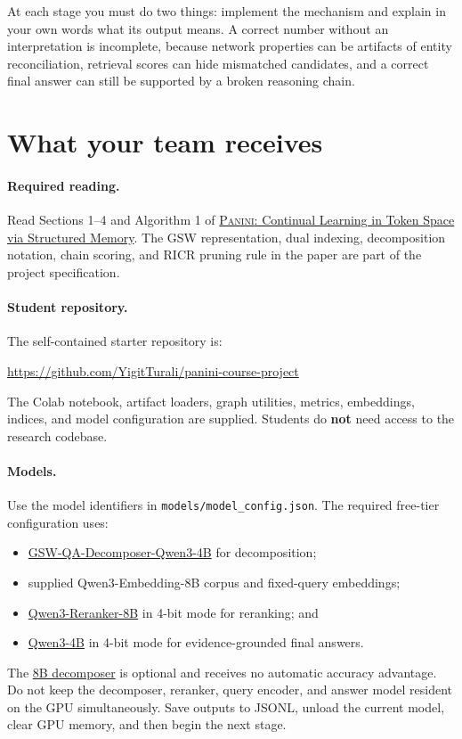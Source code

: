 \documentclass[11pt]{article}
\newcommand{\code}[1]{\texttt{#1}}
\newcommand{\RICR}{{\mdseries\textsc{RICR}}\xspace}
\newcommand{\PANINI}{{\mdseries\textsc{Panini}}\xspace}
\begin{document}
At each stage you must do two things: implement the mechanism and explain in
your own words what its output means. A correct number without an
interpretation is incomplete, because network properties can be artifacts of
entity reconciliation, retrieval scores can hide mismatched candidates, and a
correct final answer can still be supported by a broken reasoning chain.

\section{What your team receives}

\paragraph{Required reading.}
Read Sections 1--4 and Algorithm 1 of
\href{https://arxiv.org/abs/2602.15156}{\PANINI: Continual Learning in Token
Space via Structured Memory}. The GSW representation, dual indexing,
decomposition notation, chain scoring, and \RICR pruning rule in the paper are
part of the project specification.

\paragraph{Student repository.}
The self-contained starter repository is:
\begin{center}
\url{https://github.com/YigitTurali/panini-course-project}
\end{center}
The Colab notebook, artifact loaders, graph utilities, metrics, embeddings,
indices, and model configuration are supplied. Students do \textbf{not} need
access to the research codebase.

\paragraph{Models.}
Use the model identifiers in \code{models/model\_config.json}. The required
free-tier configuration uses:
\begin{itemize}
  \item \href{https://huggingface.co/yigitturali/GSW-QA-Decomposer-Qwen3-4B}
        {GSW-QA-Decomposer-Qwen3-4B} for decomposition;
  \item supplied Qwen3-Embedding-8B corpus and fixed-query embeddings;
  \item \href{https://huggingface.co/Qwen/Qwen3-Reranker-8B}
        {Qwen3-Reranker-8B} in 4-bit mode for reranking; and
  \item \href{https://huggingface.co/Qwen/Qwen3-4B}
        {Qwen3-4B} in 4-bit mode for evidence-grounded final answers.
\end{itemize}
The
\href{https://huggingface.co/yigitturali/GSW-QA-Decomposer-Qwen3-8B}
{8B decomposer} is optional and receives no automatic accuracy advantage.
Do not keep the decomposer, reranker, query encoder, and answer model resident
on the GPU simultaneously. Save outputs to JSONL, unload the current model,
clear GPU memory, and then begin the next stage.
\end{document}
